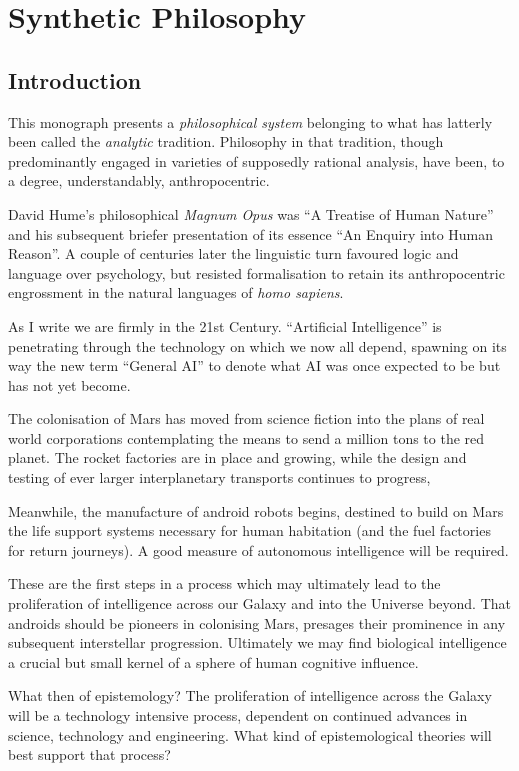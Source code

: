 \documentclass[10pt,titlepage]{book}
\begin{document}
\part{Synthetic Philosophy}

\chapter{Introduction}

This monograph presents a \emph{philosophical system} belonging to what has latterly been called the \emph{analytic} tradition.
Philosophy in that tradition, though predominantly engaged in varieties of supposedly rational analysis, have been, to a degree, understandably, anthropocentric.

David Hume's philosophical \emph{Magnum Opus} was ``A Treatise of Human Nature'' \cite{humeTHN} and his subsequent briefer presentation of its essence ``An Enquiry into Human Reason''\cite{humeECHU}.
A couple of centuries later the linguistic turn favoured logic and language over psychology, but resisted formalisation to retain its anthropocentric engrossment in the natural languages of \emph{homo sapiens}.

As I write we are firmly in the 21st Century.
``Artificial Intelligence'' is penetrating through the technology on which we now all depend, spawning on its way the new term ``General AI'' to denote what AI was once expected to be but has not yet become.

The colonisation of Mars has moved from science fiction into the plans of real world corporations contemplating the means to send a million tons to the red planet.
The rocket factories are in place and growing, while the design and testing of ever larger interplanetary transports continues to progress,

Meanwhile, the manufacture of android robots begins, destined to build on Mars the life support systems necessary for human habitation (and the fuel factories for return journeys).
A good measure of autonomous intelligence will be required.

These are the first steps in a process which may ultimately lead to the proliferation of intelligence across our Galaxy and into the Universe beyond.
That androids should be pioneers in colonising Mars, presages their prominence in any subsequent interstellar progression.
Ultimately we may find biological intelligence a crucial but small kernel of a sphere of human cognitive influence.

What then of epistemology?
The proliferation of intelligence across the Galaxy will be a technology intensive process, dependent on continued advances in science, technology and engineering.
What kind of epistemological theories will best support that process?
\end{document}
